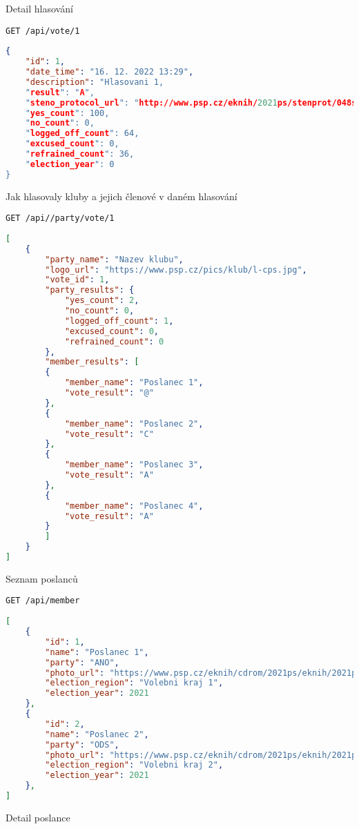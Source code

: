 Detail hlasování

\begin{lstlisting}[]
GET /api/vote/1
\end{lstlisting}

\begin{lstlisting}[language=json,firstnumber=1,tabsize=2]
{
	"id": 1,
	"date_time": "16. 12. 2022 13:29",
	"description": "Hlasovani 1,
	"result": "A",
	"steno_protocol_url": "http://www.psp.cz/eknih/2021ps/stenprot/048schuz/s048109.htm#h76",
	"yes_count": 100,
	"no_count": 0,
	"logged_off_count": 64,
	"excused_count": 0,
	"refrained_count": 36,
	"election_year": 0
}
\end{lstlisting}

Jak hlasovaly kluby a jejich členové v daném hlasování

\begin{lstlisting}[]
GET /api//party/vote/1
\end{lstlisting}

\begin{lstlisting}[language=json,firstnumber=1,tabsize=2]
[
	{
		"party_name": "Nazev klubu",
		"logo_url": "https://www.psp.cz/pics/klub/l-cps.jpg",
		"vote_id": 1,
		"party_results": {
			"yes_count": 2,
			"no_count": 0,
			"logged_off_count": 1,
			"excused_count": 0,
			"refrained_count": 0
		},
		"member_results": [
		{
			"member_name": "Poslanec 1",
			"vote_result": "@"
		},
		{
			"member_name": "Poslanec 2",
			"vote_result": "C"
		},
		{
			"member_name": "Poslanec 3",
			"vote_result": "A"
		},
		{
			"member_name": "Poslanec 4",
			"vote_result": "A"
		}
		]
	}
]
\end{lstlisting}

Seznam poslanců

\begin{lstlisting}[]
GET /api/member
\end{lstlisting}

\begin{lstlisting}[language=json,firstnumber=1,tabsize=2]
[
	{
		"id": 1,
		"name": "Poslanec 1",
		"party": "ANO",
		"photo_url": "https://www.psp.cz/eknih/cdrom/2021ps/eknih/2021ps/poslanci/i6474.jpg",
		"election_region": "Volebni kraj 1",
		"election_year": 2021
	},
	{
		"id": 2,
		"name": "Poslanec 2",
		"party": "ODS",
		"photo_url": "https://www.psp.cz/eknih/cdrom/2021ps/eknih/2021ps/poslanci/i6804.jpg",
		"election_region": "Volebni kraj 2",
		"election_year": 2021
	},
]
\end{lstlisting}

Detail poslance

